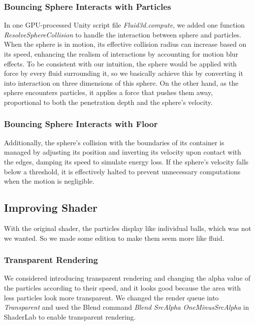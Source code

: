 \documentclass{article}
\begin{document}
\subsubsection{Bouncing Sphere Interacts with Particles}
 \hspace{1em} In one GPU-processed Unity script file \textit{Fluid3d.compute}, we added one function \textit{ResolveSphereCollision} to handle the interaction between sphere and particles. When the sphere is in motion, its effective collision radius can increase based on its speed, enhancing the realism of interactions by accounting for motion blur effects. To be consistent with our intuition, the sphere would be applied with force by every fluid surrounding it, so we basically achieve this by converting it into interaction on three dimensions of this sphere. On the other hand, as the sphere encounters particles, it applies a force that pushes them away, proportional to both the penetration depth and the sphere's velocity. 




\subsubsection{Bouncing Sphere Interacts with Floor}
 \hspace{1em} Additionally, the sphere's collision with the boundaries of its container is managed by adjusting its position and inverting its velocity upon contact with the edges, damping its speed to simulate energy loss. If the sphere's velocity falls below a threshold, it is effectively halted to prevent unnecessary computations when the motion is negligible.





\subsection{Improving Shader}
\hspace{1em} With the original shader, the particles display like individual balls, which was not we wanted. So we made some edition to make them seem more like fluid.
\subsubsection{Transparent Rendering}
\hspace{1em} We considered introducing transparent rendering and changing the alpha value of the particles according to their speed, and it looks good because the area with less particles look more transparent. We changed the render queue into \textit{Transparent} and used the Blend command \textit{Blend SrcAlpha OneMinusSrcAlpha} in ShaderLab to enable transparent rendering.
\end{document}
